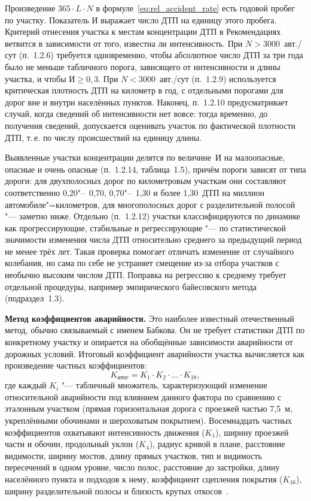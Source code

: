 \documentclass[coursework]{SCWorks}
\begin{document}
Произведение $365 \cdot L \cdot N$ в формуле~\eqref{eq:rel_accident_rate}
есть годовой пробег по участку. Показатель $\mathit{И}$ выражает
число ДТП на единицу этого пробега.
Критерий отнесения участка к местам концентрации ДТП в Рекомендациях
ветвится в зависимости от того, известна ли интенсивность. При
$N > 3000$~авт./сут (п.~1.2.6) требуется одновременно, чтобы абсолютное
число ДТП за три года было не меньше табличного порога, зависящего от
интенсивности и длины участка, и чтобы $\mathit{И} \geq 0{,}3$. При
$N < 3000$~авт./сут (п.~1.2.9) используется критическая плотность ДТП
на километр в год, с отдельными порогами для дорог вне и внутри
населённых пунктов. Наконец, п.~1.2.10 предусматривает случай, когда
сведений об интенсивности нет вовсе: тогда временно, до получения
сведений, допускается оценивать участок по фактической плотности ДТП,
т.\,е. по числу происшествий на единицу длины.

Выявленные участки концентрации делятся по величине~$\mathit{И}$ на
малоопасные, опасные и очень опасные (п.~1.2.14, таблица~1.5), причём
пороги зависят от типа дороги: для двухполосных дорог по километровым
участкам они составляют соответственно 0{,}20"--~0{,}70, 0{,}70"--~1{,}30
и более 1{,}30~ДТП на миллион автомобиле"=километров, для многополосных
дорог с разделительной полосой "--- заметно ниже. Отдельно (п.~1.2.12)
участки классифицируются по динамике как прогрессирующие, стабильные и
регрессирующие "--- по статистической значимости изменения числа ДТП
относительно среднего за предыдущий период не менее трёх лет. Такая
проверка помогает отличать изменение от случайного колебания, но сама
по себе не устраняет смещение из-за отбора участков с необычно высоким
числом ДТП. Поправка на регрессию к среднему требует отдельной процедуры,
например эмпирического байесовского метода (подраздел~1.3).

\textbf{Метод коэффициентов аварийности.} Это наиболее известный
отечественный метод, обычно связываемый с именем Бабкова. Он не требует
статистики ДТП по конкретному участку и опирается на обобщённые
зависимости аварийности от дорожных условий. Итоговый коэффициент
аварийности участка вычисляется как произведение частных коэффициентов:
\begin{equation}
  K_{\text{итог}} = K_{1} \cdot K_{2} \cdot \ldots \cdot K_{18},
  \label{eq:babkov}
\end{equation}
где каждый $K_i$ "--- табличный множитель, характеризующий изменение
относительной аварийности под влиянием данного фактора по сравнению с
эталонным участком (прямая горизонтальная дорога с проезжей частью
7{,}5~м, укреплёнными обочинами и шероховатым покрытием). Восемнадцать
частных коэффициентов охватывают интенсивность движения ($K_1$), ширину
проезжей части и обочин, продольный уклон ($K_4$), радиус кривой в плане,
расстояние видимости, ширину мостов, длину прямых участков, тип и
видимость пересечений в одном уровне, число полос, расстояние до
застройки, длину населённого пункта и подходов к нему, коэффициент
сцепления покрытия ($K_{16}$), ширину разделительной полосы и близость
крутых откосов~\cite{babkov1993,vsn2586}.
\end{document}
